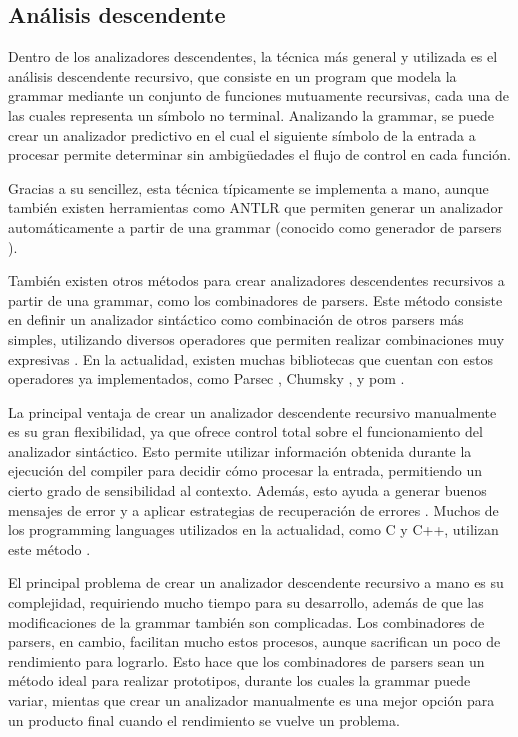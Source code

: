 \subsection{Análisis descendente}

Dentro de los analizadores descendentes, la técnica más general y utilizada es
el análisis descendente recursivo, que consiste en un \gls{program} que modela la
\gls{grammar} mediante un conjunto de funciones mutuamente recursivas, cada una
de las cuales representa un símbolo no terminal. Analizando la \gls{grammar}, se
puede crear un analizador predictivo en el cual el siguiente símbolo de la
entrada a procesar permite determinar sin ambigüedades el flujo de control en
cada función. \parencite{dragon-book}

Gracias a su sencillez, esta técnica típicamente se implementa a mano, aunque
también existen herramientas como ANTLR \parencite{ANTLR} que permiten generar
un analizador automáticamente a partir de una \gls{grammar} (conocido como
generador de \glspl{parser} \parencite{dragon-book}).

También existen otros métodos para crear analizadores descendentes
recursivos a partir de una \gls{grammar}, como los combinadores de
\glspl{parser}. Este método consiste en definir un analizador sintáctico como
combinación de otros \glspl{parser} más simples, utilizando diversos operadores
que permiten realizar combinaciones muy expresivas
\parencite{parser-combinators}. En la actualidad, existen muchas bibliotecas que
cuentan con estos operadores ya implementados, como Parsec \parencite{parsec}, Chumsky
\parencite{chumsky}, y pom \parencite{pom}.

La principal ventaja de crear un analizador descendente recursivo manualmente es su
gran flexibilidad, ya que ofrece control total sobre el funcionamiento del
analizador sintáctico. Esto permite utilizar información obtenida durante la
ejecución del \gls{compiler} para decidir cómo procesar la entrada, permitiendo
un cierto grado de sensibilidad al contexto. Además, esto ayuda a generar buenos
mensajes de error y a aplicar estrategias de recuperación de errores
\parencite{errors-clang}. Muchos de los \glspl{programming language} utilizados
en la actualidad, como C y C++, utilizan este método
\parencite{parser-types-survey}.

El principal problema de crear un analizador descendente recursivo a mano es su
complejidad, requiriendo mucho tiempo para su desarrollo, además de que las
modificaciones de la \gls{grammar} también son complicadas. Los combinadores de
\glspl{parser}, en cambio, facilitan mucho estos procesos, aunque sacrifican un
poco de rendimiento para lograrlo. Esto hace que los combinadores de
\glspl{parser} sean un método ideal para realizar prototipos, durante los cuales
la \gls{grammar} puede variar, mientas que crear un analizador manualmente es
una mejor opción para un producto final cuando el rendimiento se vuelve un
problema.


